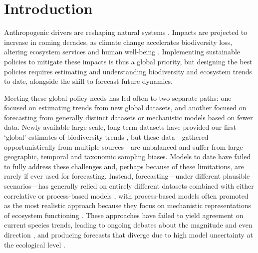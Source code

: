 \documentclass[11pt]{article}
\newcommand{\llabel}[1]{\hypertarget{lintarget:#1}{}\linelabel{lin:#1}}
\begin{document}
\begin{abstract}
\end{abstract}

\linenumbers

\section{Introduction}

Anthropogenic drivers are reshaping natural systems \citep{Diaz2019}. Impacts are projected to increase in coming decades, as climate change accelerates biodiversity loss, altering ecosystem services and human well-being \citep{IPBES2019}.
Implementing sustainable policies to mitigate these impacts is thus a global priority, but designing the best policies requires estimating and understanding biodiversity and ecosystem trends to date, alongside the skill to forecast future dynamics. %

Meeting these \llabel{global}global policy needs has led often to two separate paths: one focused on estimating trends from new global datasets, and another focused on forecasting from generally distinct datasets or mechanistic models based on fewer data. 
Newly available large-scale, long-term datasets have provided our first `global' estimates of biodiversity trends \citep[e.g.][]{loh2005living,Dornelas2018}, but these data---gathered opportunistically from multiple sources---are unbalanced and suffer from large geographic, temporal and taxonomic sampling biases.\llabel{bias1} Models to date have failed to fully address these challenges and, perhaps because of these limitations, are rarely if ever used for forecasting.
Instead, forecasting---under different plausible scenarios---has generally relied on entirely different datasets combined with either correlative or process-based models \citep{IPBES2019}, with process-based models often promoted as the most realistic approach because they focus on mechanistic representations of ecosystem functioning \citep{Urban2016, Pilowsky2022}. These approaches have failed to yield agreement on current species trends, leading to ongoing debates about the magnitude and even direction \citep{Dornelas2014, Leung2020, Buschke2021, Johnson2024}, and producing forecasts that diverge due to high model uncertainty at the ecological level \citep{Cheaib2012, Thuiller2019}.
 
\end{document}
